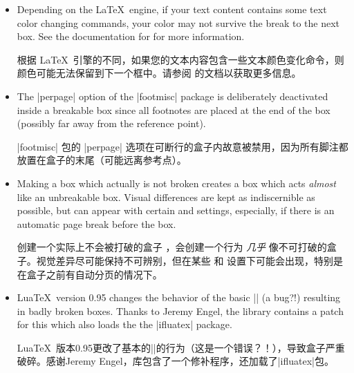 \begin{itemize}
对于嵌套框的关键字将自动被忽略\footnote{直到|tcolorbox| 3.04，关键字对于嵌套框不会被忽略。}，即内部框始终不可分割。

After all, in the unlikely case you really want to have the nested box to be breakable,
use  for the nested
box\footnote{ acts like  until |tcolorbox| 3.04.}.
\textbf{But, a breakable box inside a breakable box will usually give a mess.}

毕竟，如果您真的想让嵌套框可打破，可以在嵌套框中使用（在|tcolorbox| 3.04之前的版本中类似于）。但是，可打破的框内部通常会变得混乱。
\item{}
Depending on the \LaTeX\ engine, if your text content contains some text
color changing commands, your color may not survive the break to the next box.
See the documentation for  for more information.

根据 \LaTeX\ 引擎的不同，如果您的文本内容包含一些文本颜色变化命令，则颜色可能无法保留到下一个框中。请参阅  的文档以获取更多信息。
\item{}
The |perpage| option of the |footmisc| package is deliberately deactivated
inside a breakable box since all footnotes are placed at the end
of the box (possibly far away from the reference point).

|footmisc| 包的 |perpage| 选项在可断行的盒子内故意被禁用，因为所有脚注都放置在盒子的末尾（可能远离参考点）。
\item{}
Making a box  which actually is not broken creates
a box which acts \emph{almost} like an unbreakable box. Visual differences
are kept as indiscernible as possible, but can appear with certain
 and  settings, especially, if there
is an automatic page break before the box.

创建一个实际上不会被打破的盒子 ，会创建一个行为 \emph{几乎} 像不可打破的盒子。视觉差异尽可能保持不可辨别，但在某些  和  设置下可能会出现，特别是在盒子之前有自动分页的情况下。
\item{}
Lua\TeX\ version 0.95 changes the behavior of the basic |\vsplit| (a bug?!)
resulting in badly broken boxes. Thanks to Jeremy Engel,
the  library contains a patch for this which
also loads the the |ifluatex| package.

Lua\TeX\ 版本0.95更改了基本的|\vsplit|的行为（这是一个错误？！），导致盒子严重破碎。感谢Jeremy Engel，库包含了一个修补程序，还加载了|ifluatex|包。
\end{itemize}

